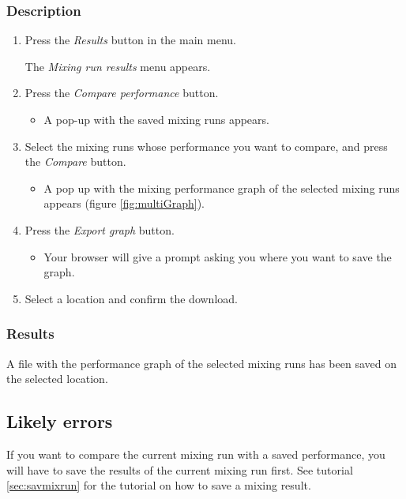\subsubsection{Description}
\begin{enumerate}
	\item Press the \emph{Results} button in the main menu.
		\begin{itemize}
            The \emph{Mixing run results} menu appears.
		\end{itemize}
	\item Press the \emph{Compare performance} button.
		\begin{itemize}
            \item A pop-up with the saved mixing runs appears.
		\end{itemize}
	\item Select the mixing runs whose performance you want to compare, and press the \emph{Compare} button. \label{item:exportMultiGraphComp}
		\begin{itemize}
            \item A pop up with the mixing performance graph of the selected mixing runs appears (figure \ref{fig:multiGraph}).
		\end{itemize}
	\item Press the \emph{Export graph} button.
        \begin{itemize}
            \item Your browser will give a prompt asking you where you want to save the graph.
        \end{itemize}
	\item  Select a location and confirm the download.
\end{enumerate}


\subsubsection{Results}
A file with the performance graph of the selected mixing runs has been saved on the selected location.

\subsection{Likely errors}
If you want to compare the current mixing run with a saved performance, you will have to save the results of the current mixing run first. See tutorial \ref{sec:savmixrun} for the tutorial on how to save a mixing result.

